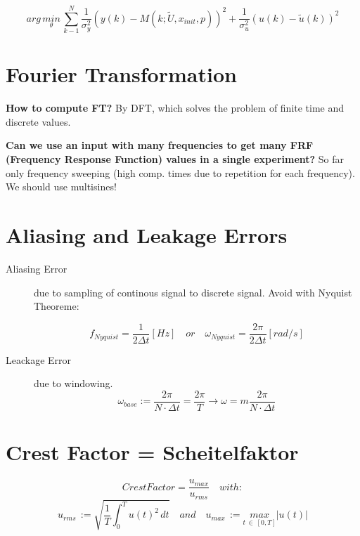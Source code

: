 \begin{equation*}
arg \, \underset { \theta  }{ min } \, \sum _{ k-1 }^{ N }{ \frac { 1 }{ { \sigma  }_{ y }^{ 2 } }  } { (y(k)-M(k;\tilde { U } ,{ x }_{ init },p)) }^{ 2 }+\frac { 1 }{ { \sigma  }_{ u }^{ 2 } } { (u(k)-\tilde{ u }(k) ) }^{ 2 }
\end{equation*}





\newpage
\section*{Fourier Transformation}
\textbf{How to compute FT?} By DFT, which solves the problem of finite time and discrete values.

\textbf{Can we use an input with many frequencies to get many FRF (Frequency Response Function) values in a single experiment?} So far only frequency sweeping (high comp. times due to repetition for each frequency). We should use multisines!

\section*{Aliasing and Leakage Errors}
\begin{description}
\item[Aliasing Error] due to sampling of continous signal to discrete signal. Avoid with Nyquist Theoreme:

\begin{equation*}
f_{Nyquist} = \frac{1}{2\Delta t} [Hz] \quad or \quad \omega_{Nyquist} = \frac{2 \pi }{ 2\Delta t} [rad/s]
\end{equation*}

\item[Leackage Error] due to windowing.
\begin{equation*}
\omega _{ base }:=\frac { 2\pi  }{ N\cdot \Delta t } =\frac { 2\pi  }{ T }  \rightarrow \omega = m\frac { 2\pi  }{ N\cdot \Delta t }
\end{equation*}
\end{description}


\section*{Crest Factor = Scheitelfaktor}
\begin{equation*}
CrestFactor=\frac { u_{ max } }{ u_{ rms } } \quad with:
\end{equation*}
\begin{equation*}
u_{ rms }\, := \sqrt{ \frac { 1 }{ T } \int _{ 0 }^{ T }{ u(t)^2 \, dt }  } \quad and \quad u_{ max }\, :=\underset { t\, \in \, [0,T] }{ max } |u(t)|
\end{equation*}

